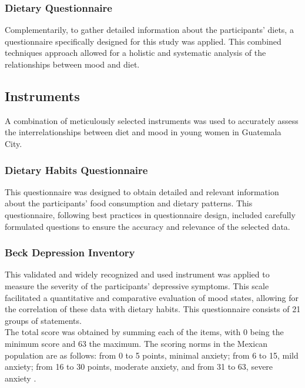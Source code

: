 \documentclass[jou]{apa7}
\begin{document}
\subsubsection{Dietary Questionnaire}
Complementarily, to gather detailed information about the participants' diets, a questionnaire specifically designed for this study was applied. This combined techniques approach allowed for a holistic and systematic analysis of the relationships between mood and diet.


\subsection{Instruments}\label{instrumentos}

A combination of meticulously selected instruments was used to accurately assess the interrelationships between diet and mood in young women in Guatemala City.\\

\subsubsection{Dietary Habits Questionnaire}
This questionnaire was designed to obtain detailed and relevant information about the participants' food consumption and dietary patterns. This questionnaire, following best practices in questionnaire design, included carefully formulated questions to ensure the accuracy and relevance of the selected data.\\

\subsubsection{Beck Depression Inventory}
This validated and widely recognized and used instrument was applied to measure the severity of the participants' depressive symptoms. This scale facilitated a quantitative and comparative evaluation of mood states, allowing for the correlation of these data with dietary habits. This questionnaire consists of 21 groups of statements.\\

The total score was obtained by summing each of the items, with 0 being the minimum score and 63 the maximum. The scoring norms in the Mexican population are as follows: from 0 to 5 points, minimal anxiety; from 6 to 15, mild anxiety; from 16 to 30 points, moderate anxiety, and from 31 to 63, severe anxiety \parencite{beckDepressionCausesTreatment2009}.
\end{document}
